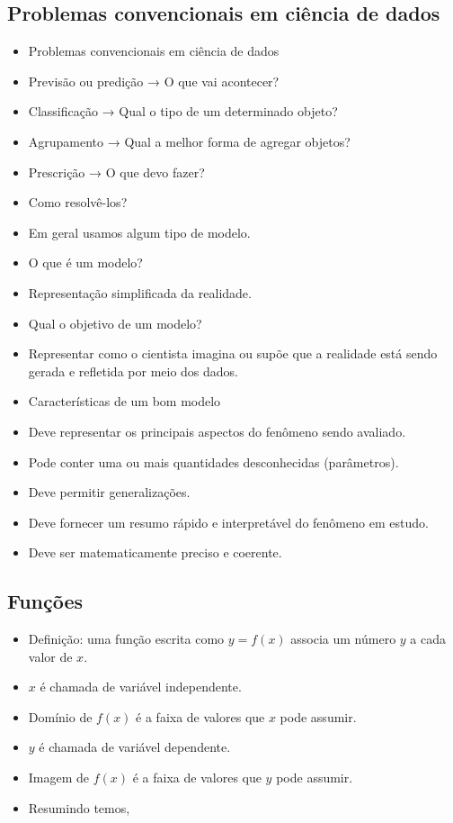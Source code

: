 \documentclass[
]{article}
\providecommand{\tightlist}{%
  \setlength{\itemsep}{0pt}\setlength{\parskip}{0pt}}
\begin{document}
\hypertarget{problemas-convencionais-em-ciuxeancia-de-dados}{%
\subsection{Problemas convencionais em ciência de
dados}\label{problemas-convencionais-em-ciuxeancia-de-dados}}

\begin{itemize}
\item
  Problemas convencionais em ciência de dados
\item
  Previsão ou predição → O que vai acontecer?
\item
  Classificação → Qual o tipo de um determinado objeto?
\item
  Agrupamento → Qual a melhor forma de agregar objetos?
\item
  Prescrição → O que devo fazer?
\item
  Como resolvê-los?
\item
  Em geral usamos algum tipo de modelo.
\item
  O que é um modelo?
\item
  Representação simplificada da realidade.
\item
  Qual o objetivo de um modelo?
\item
  Representar como o cientista imagina ou supõe que a realidade está
  sendo gerada e refletida por meio dos dados.
\item
  Características de um bom modelo
\item
  Deve representar os principais aspectos do fenômeno sendo avaliado.
\item
  Pode conter uma ou mais quantidades desconhecidas (parâmetros).
\item
  Deve permitir generalizações.
\item
  Deve fornecer um resumo rápido e interpretável do fenômeno em estudo.
\item
  Deve ser matematicamente preciso e coerente.
\end{itemize}

\hypertarget{funuxe7uxf5es}{%
\subsection{Funções}\label{funuxe7uxf5es}}

\begin{itemize}
\tightlist
\item
  Definição: uma função escrita como \(y = f(x)\) associa um número
  \(y\) a cada valor de \(x\).
\item
  \(x\) é chamada de variável independente.
\item
  Domínio de \(f(x)\) é a faixa de valores que \(x\) pode assumir.
\item
  \(y\) é chamada de variável dependente.
\item
  Imagem de \(f(x)\) é a faixa de valores que \(y\) pode assumir.
\item
  Resumindo temos,
\end{itemize}
\end{document}
